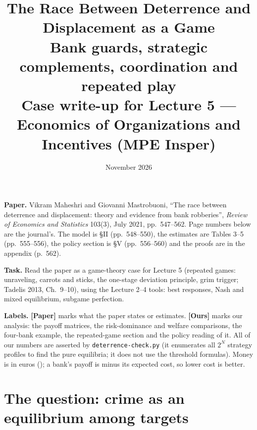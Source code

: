 \documentclass[11pt,a4paper]{article}
\title{\textbf{The Race Between Deterrence and Displacement as a Game}\\[4pt]
  \large Bank guards, strategic complements, coordination and repeated play\\[2pt]
  \normalsize Case write-up for Lecture 5 --- Economics of Organizations and Incentives (MPE Insper)}
\date{November 2026}
\newcommand{\eur}{\texteuro{}}
\newcommand{\paper}{\textbf{[Paper]}}
\newcommand{\ours}{\textbf{[Ours]}}
\begin{document}
\maketitle
\thispagestyle{empty}

\begin{tcolorbox}[colback=src!4,colframe=src,boxrule=0.5pt,title={The assignment and the sources}]
\textbf{Paper.} Vikram Maheshri and Giovanni Mastrobuoni, ``The race between deterrence and
displacement: theory and evidence from bank robberies'', \emph{Review of Economics and Statistics}
103(3), July 2021, pp.\ 547--562. Page numbers below are the journal's. The model is \S II
(pp.\ 548--550), the estimates are Tables 3--5 (pp.\ 555--556), the policy section is \S V
(pp.\ 556--560) and the proofs are in the appendix (p.\ 562).

\textbf{Task.} Read the paper as a game-theory case for Lecture 5 (repeated games: unraveling,
carrots and sticks, the one-stage deviation principle, grim trigger; Tadelis 2013, Ch.\ 9--10),
using the Lecture 2--4 tools: best responses, Nash and mixed equilibrium, subgame perfection.

\textbf{Labels.} \paper{} marks what the paper states or estimates. \ours{} marks our analysis:
the payoff matrices, the risk-dominance and welfare comparisons, the four-bank example, the
repeated-game section and the policy reading of it. All of our numbers are asserted by
\texttt{deterrence-check.py} (it enumerates all $2^N$ strategy profiles to find the pure equilibria;
it does not use the threshold formulas). Money is in euros (\eur); a bank's payoff is minus its
expected cost, so lower cost is better.
\end{tcolorbox}

\section{The question: crime as an equilibrium among targets}
\end{document}

